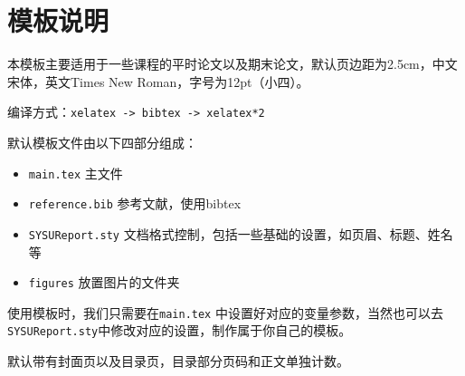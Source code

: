 \documentclass{SYSUReport}
\date{\today}
\begin{document}
\cover
\thispagestyle{empty} %
\clearpage

%
%


\setcounter{page}{1}
\tableofcontents
\clearpage

\setcounter{page}{1}


\section{模板说明}

本模板主要适用于一些课程的平时论文以及期末论文，默认页边距为2.5cm，中文宋体，英文Times New Roman，字号为12pt（小四）。

编译方式：\verb|xelatex -> bibtex -> xelatex*2|

默认模板文件由以下四部分组成：

\begin{itemize}
    \item \texttt{main.tex} 主文件
    \item \texttt{reference.bib} 参考文献，使用bibtex
    \item \texttt{SYSUReport.sty} 文档格式控制，包括一些基础的设置，如页眉、标题、姓名等
    \item \texttt{figures} 放置图片的文件夹
\end{itemize}

使用模板时，我们只需要在\texttt{main.tex} 中设置好对应的变量参数，当然也可以去\texttt{SYSUReport.sty}中修改对应的设置，制作属于你自己的模板。

默认带有封面页以及目录页，目录部分页码和正文单独计数。
\end{document}
